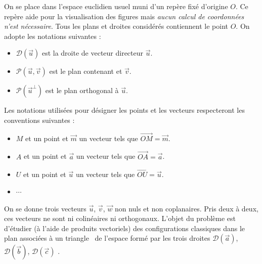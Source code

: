 On se place dans l'espace euclidien usuel muni d'un repère fixé d'origine $O$. Ce repère aide pour la visualisation des figures mais \emph{aucun calcul de coordonnées n'est nécessaire}. Tous les plans et droites considérés contiennent le point $O$. On adopte les notations suivantes :
\begin{itemize}
\item $\mathcal{D}(\overrightarrow{u})$ est la droite de vecteur directeur $\overrightarrow{u}$.
\item $\mathcal{P}(\overrightarrow{u},\overrightarrow{v})$ est le plan contenant  et $\overrightarrow{v}$.
\item $\mathcal{P}(\overrightarrow{u}^\bot)$ est le plan orthogonal à $\overrightarrow{u}$.
\end{itemize}
Les notations utilisées pour désigner les points et les vecteurs respecteront les conventions suivantes :
\begin{itemize}
\item $M$ et un point et $\overrightarrow{m}$ un vecteur tels que $\overrightarrow{OM}=\overrightarrow{m}$.
\item $A$ et un point et $\overrightarrow{a}$ un vecteur tels que $\overrightarrow{OA}=\overrightarrow{a}$.
\item $U$ et un point et $\overrightarrow{u}$ un vecteur tels que $\overrightarrow{OU}=\overrightarrow{u}$.
\item $\cdots$
\end{itemize}
On se donne trois vecteurs $\overrightarrow{u}$, $\overrightarrow{v}$, $\overrightarrow{w}$ non nuls et non coplanaires. Pris deux à deux, ces vecteurs ne sont ni colinéaires ni orthogonaux. L'objet du problème est d'étudier (à l'aide de produits vectoriels) des configurations classiques dans le plan associées à un \og triangle\fg~ de l'espace formé par les trois droites $\mathcal{D}(\overrightarrow{a})$, $\mathcal{D}(\overrightarrow{b})$, $\mathcal{D}(\overrightarrow{c})$ .

